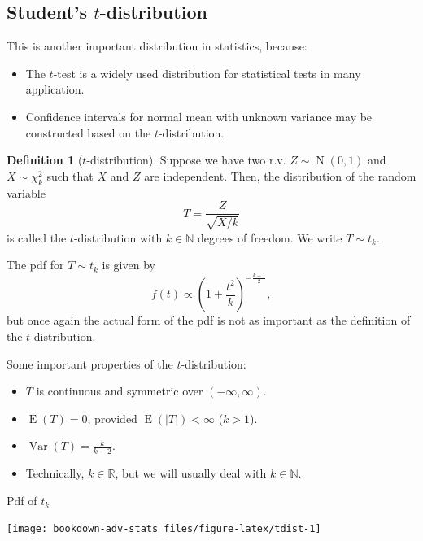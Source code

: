 \documentclass[
]{book}
\providecommand{\tightlist}{%
  \setlength{\itemsep}{0pt}\setlength{\parskip}{0pt}}
\DeclareMathOperator{\E}{E}
\DeclareMathOperator{\Var}{Var}
\DeclareMathOperator{\N}{N}
\newcommand{\bbR}{\mathbb{R}}
\newcommand{\bbN}{\mathbb{N}}
\theoremstyle{definition}
\newtheorem{definition}{Definition}[chapter]
\theoremstyle{definition}
\theoremstyle{definition}
\theoremstyle{definition}
\theoremstyle{remark}
\begin{document}
\hypertarget{students-t-distribution}{%
\subsection{\texorpdfstring{Student's \(t\)-distribution}{Student's t-distribution}}\label{students-t-distribution}}

This is another important distribution in
statistics, because:

\begin{itemize}
\tightlist
\item
  The \(t\)-test is a widely used distribution for statistical tests in many
  application.
\item
  Confidence intervals for normal mean with unknown variance may be
  constructed based on the \(t\)-distribution.
\end{itemize}

\begin{definition}[$t$-distribution]
Suppose we have two r.v. \(Z\sim\N(0,1)\) and \(X\sim\chi^2_k\) such that \(X\) and \(Z\) are independent.
Then, the distribution of the random variable
\[T = \frac{Z}{\sqrt{X/k}}\] is called the \(t\)-distribution with \(k\in\bbN\)
degrees of freedom. We write \(T\sim t_k\).
\end{definition}

The pdf for \(T \sim t_k\) is given by
\[f(t) \propto \left(1 + \frac{t^2}{k} \right)^{-\frac{k+1}{2}},\] but
once again the actual form of the pdf is not as important as the
definition of the \(t\)-distribution.

Some important properties of the \(t\)-distribution:

\begin{itemize}
\tightlist
\item
  \(T\) is continuous and symmetric over \((-\infty,\infty)\).
\item
  \(\E(T)=0\), provided \(\E(|T|) < \infty\) (\(k>1\)).
\item
  \(\Var(T) = \frac{k}{k-2}\).
\item
  Technically, \(k\in\bbR\), but we will usually deal with \(k\in\bbN\).
\end{itemize}

Pdf of \(t_k\)

\begin{center}\texttt{[image: bookdown-adv-stats\_files/figure-latex/tdist-1]} \end{center}
\end{document}
